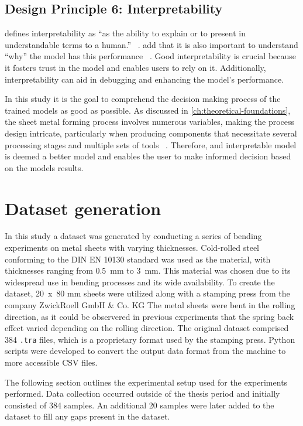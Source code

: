 {\subsection*{Design Principle 6: Interpretability}
\cite{doshi2017towards} defines interpretability as ``as the ability to explain or to present in understandable
terms to a human.''
~\cite[p. w]{doshi2017towards}.
\cite{miller2019explanation} add that it is also important to understand ``why'' the model has this performance
~\cite[p. 1]{miller2019explanation}.
Good interpretability is crucial because it fosters trust in the model and enables users to rely on it.
Additionally, interpretability can aid in debugging and enhancing the model's performance.

In this study it is the goal to comprehend the decision making process of the trained models as good as possible.
As discussed in \cref{ch:theoretical-foundations}, the sheet metal forming process involves numerous
variables, making the process design intricate, particularly when producing components that necessitate several
processing stages and multiple sets of tools
~\cite[p. 1]{dib_singleensembleclassifiers_2020}.
Therefore,  and interpretable model is deemed a better model and enables the user to make informed decision based
on the models results.


\section{Dataset generation}\label{sec:dataset-generation}
In this study a dataset was generated by conducting a series of bending experiments on metal sheets with varying
thicknesses.
Cold-rolled steel conforming to the DIN EN 10130 standard was used as the material, with thicknesses ranging from
0.5~mm to 3~mm.
This material was chosen due to its widespread use in bending processes and its wide availability.
To create the dataset, 20~x~80 mm sheets were utilized along with a stamping press from the company ZwickRoell GmbH
\& Co. KG
The metal sheets were bent in the rolling direction, as it could be observered in previous experiments that the spring
back effect varied depending on the rolling direction.
The original dataset comprised 384 \texttt{.tra} files, which is a proprietary format used by the stamping press.
Python scripts were developed to convert the output data format from the machine to more accessible CSV files.

The following section outlines the experimental setup used for the experiments performed.
Data collection occurred outside of the thesis period and initially consisted of 384 samples.
An additional 20 samples were later added to the dataset to fill any gaps present in the dataset.

}
